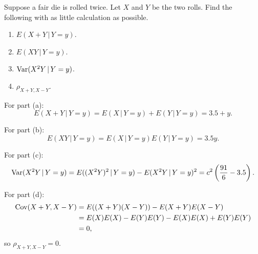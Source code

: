 \begin{problem}[Handout 15, \# 15]
  Suppose a fair die is rolled twice. Let \(X\) and \(Y\) be the two
  rolls. Find the following with as little calculation as possible.
  \begin{enumerate}[label=(\alph*),noitemsep]
  \item \(E(X+Y\,|\,Y=y)\).
  \item \(E(XY\,|\,Y=y)\).
  \item \(\operatorname{Var}(X^2Y\,|\,Y=y)\).
  \item \(\rho_{X+Y,X-Y}\).
  \end{enumerate}
\end{problem}
\begin{solution}
  For part (a):
  \[E(X+Y\,|\,Y=y) = E(X\,|\,Y=y) + E(Y\,|\,Y=y) = 3.5+y.\]

  For part (b):
  \[E(XY\,|\,Y=y) = E(X\,|\,Y=y)E(Y\,|\,Y=y) = 3.5y.\]

  For part (c):
  \[
    \operatorname{Var}(X^2Y\,|\,Y=y)=E((X^2Y)^2\,|\,Y=y)-E(X^2Y\,|\,Y=y)^2
    =c^2\left(\frac{91}{6}-3.5\right).
  \]

  For part (d):
  \begin{align*}
    \operatorname{Cov}(X+Y,X-Y)
    &=E((X+Y)(X-Y))-E(X+Y)E(X-Y)\\
    &=E(X)E(X)-E(Y)E(Y)-E(X)E(X)+E(Y)E(Y)\\
    &=0,
  \end{align*}
  so $\rho_{X+Y,X-Y} = 0$.
\end{solution}

